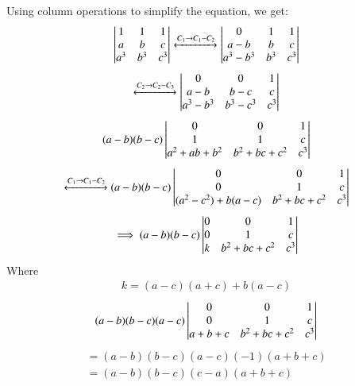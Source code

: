 Using column operations to simplify the equation, we get:
\begin{align}
\begin{vmatrix}1 & 1 & 1\\a & b & c\\a^3 & b^3 & c^3\end{vmatrix} \xleftrightarrow[]{C_1\rightarrow C_1-C_2} 
\begin{vmatrix}0 & 1 & 1\\a-b & b & c\\a^3-b^3 & b^3 & c^3\end{vmatrix}
\end{align}
\begin{align}
\xleftrightarrow[]{C_2\rightarrow C_2-C_3}
\begin{vmatrix}0 & 0 & 1\\a-b & b-c & c\\a^3 - b^3 & b^3 - c^3 & c^3\end{vmatrix}
\end{align}
\begin{align}
(a-b)(b-c)\begin{vmatrix}0 & 0 & 1\\1 & 1 & c\\a^2+ab+b^2 & b^2+bc+c^2 & c^3\end{vmatrix}
\end{align}
\begin{align}
\xleftrightarrow[]{C_1\rightarrow C_1-C_2}(a-b)(b-c)
\begin{vmatrix}0 & 0 & 1
\\0 & 1 & c
\\(a^2-c^2)+b(a-c)& b^2+bc+c^2 & c^3\end{vmatrix}
\end{align}
\begin{align}
\implies (a-b)(b-c)
\begin{vmatrix}0 & 0 & 1\\0 & 1 & c\\k & b^2+bc+c^2 & c^3\end{vmatrix}
\end{align}
Where 
\begin{align}
k = (a-c)(a+c)+b(a-c)
\end{align}
\begin{align}
(a-b)(b-c)(a-c) 
\begin{vmatrix}0 & 0 & 1\\0 & 1 & c\\a+b+c & b^2+bc+c^2 & c^3\end{vmatrix}
\end{align}
\begin{align}
=(a-b)(b-c)(a-c)(-1)(a+b+c)\\=(a-b)(b-c)(c-a)(a+b+c)
\end{align}
